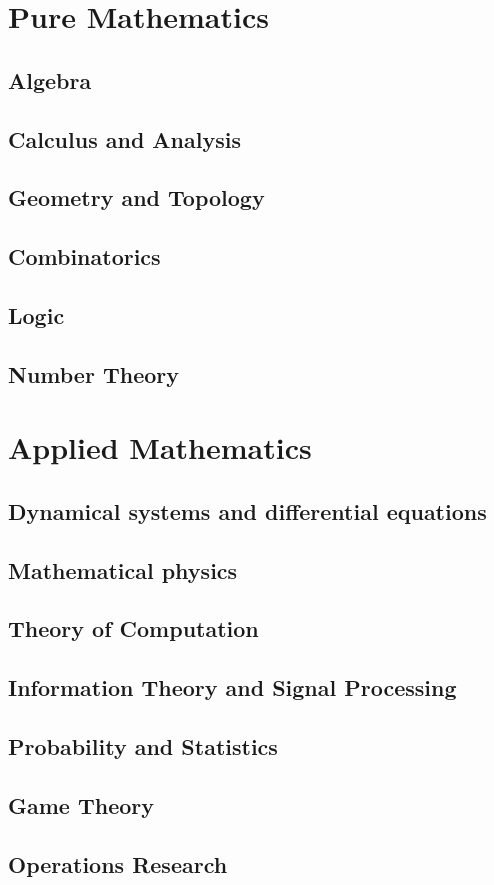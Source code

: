 \documentclass[a4paper]{book}
\begin{document}
\section{Pure Mathematics}
\subsection{Algebra}

\subsection{Calculus and Analysis}

\subsection{Geometry and Topology}

\subsection{Combinatorics}

\subsection{Logic}

\subsection{Number Theory}

\section{Applied Mathematics}
\subsection{Dynamical systems and differential equations}

\subsection{Mathematical physics}

\subsection{Theory of Computation}

\subsection{Information Theory and Signal Processing}

\subsection{Probability and Statistics}

\subsection{Game Theory}

\subsection{Operations Research}
\end{document}
